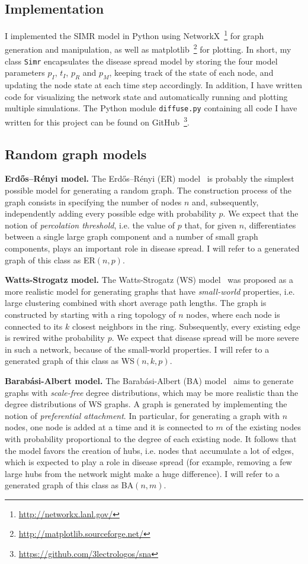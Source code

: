 \documentclass[11pt]{article} %
\begin{document}
\subsection{Implementation}
I implemented the SIMR model in Python using
NetworkX~\footnote{\url{http://networkx.lanl.gov/}} for graph
generation and manipulation, as well as
matplotlib~\footnote{\url{http://matplotlib.sourceforge.net/}} for plotting.
In short, my class \texttt{Simr} encapsulates the
disease spread model by storing the four model parameters $p_I$, $t_I$, $p_R$
and $p_M$, keeping track of the state of each node, and updating the node state
at each time step accordingly. In addition, I have
written code for visualizing the network state and automatically running
and plotting multiple simulations. The Python module \texttt{diffuse.py}
containing all code I have written for this project can be found on
GitHub~\footnote{\url{https://github.com/3lectrologos/sna}}.

\subsection{Random graph models}
\noindent\textbf{Erdős–Rényi model.} The Erdős–Rényi (ER) model~\cite{erdos} is
probably the simplest possible model for generating a random graph. The
construction process of the graph consists in specifying the number of
nodes $n$ and, subsequently, independently adding every possible edge
with probability $p$. We expect that the notion of \emph{percolation
threshold}, i.e. the value of $p$ that, for given $n$, differentiates
between a single large graph component and a number of small graph
components, plays an important role in disease spread. I will refer to a
generated graph of this class as ER$(n, p)$.

\noindent\textbf{Watts-Strogatz model.} The Watts-Strogatz (WS)
model~\cite{watts} was proposed as a more realistic model for generating graphs
that have \emph{small-world} properties, i.e. large clustering combined with
short average path lengths. The graph is constructed by starting with a ring
topology of $n$ nodes, where each node is connected to its $k$ closest neighbors
in the ring. Subsequently, every existing edge is rewired withe probability $p$.
We expect that disease spread will be more severe in such a network, because
of the small-world properties. I will refer to a generated graph of this class
as WS$(n, k, p)$.

\noindent\textbf{Barabási-Albert model.} The Barabási-Albert (BA)
model~\cite{barabasi} aims to generate graphs with \emph{scale-free} degree
distributions, which may be more realistic than the degree distributions of
WS graphs. A graph is generated by implementing the notion of
\emph{preferential attachment}. In particular, for generating a graph with
$n$ nodes, one node is added at a time and it is connected to $m$ of the
existing nodes with probability proportional to the degree of each existing
node. It follows that the model favors the creation of hubs, i.e. nodes that
accumulate a lot of edges, which is expected to play a role in disease spread
(for example, removing a few large hubs from the network might make a huge
difference). I will refer to a generated graph of this class
as BA$(n, m)$.
\end{document}
